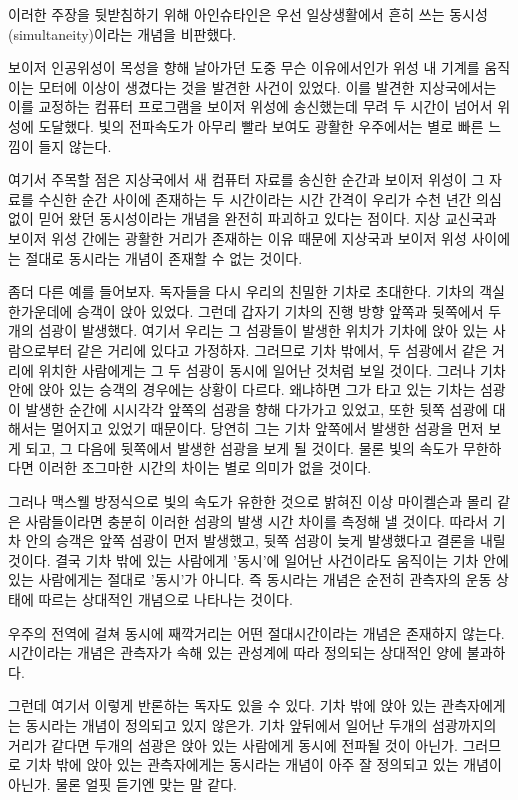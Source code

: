 이러한 주장을 뒷받침하기 위해 아인슈타인은 우선 일상생활에서 흔히 쓰는
동시성(simultaneity)이라는 개념을 비판했다.

보이저 인공위성이 목성을 향해 날아가던 도중 무슨 이유에서인가 위성 내 기계를 움직이는
모터에 이상이 생겼다는 것을 발견한 사건이 있었다. 이를 발견한 지상국에서는 이를 교정하는
컴퓨터 프로그램을 보이저 위성에 송신했는데 무려 두 시간이 넘어서 위성에 도달했다. 빛의
전파속도가 아무리 빨라 보여도 광활한 우주에서는 별로 빠른 느낌이 들지 않는다.

여기서 주목할 점은 지상국에서 새 컴퓨터 자료를 송신한 순간과 보이저 위성이 그 자료를
수신한 순간 사이에 존재하는 두 시간이라는 시간 간격이 우리가 수천 년간 의심없이 믿어 왔던
동시성이라는 개념을 완전히 파괴하고 있다는 점이다. 지상 교신국과 보이저 위성 간에는 광활한
거리가 존재하는 이유 때문에 지상국과 보이저 위성 사이에는 절대로 동시라는 개념이 존재할 수
없는 것이다.

좀더 다른 예를 들어보자. 독자들을 다시 우리의 친밀한 기차로 초대한다. 기차의 객실
한가운데에 승객이 앉아 있었다. 그런데 갑자기 기차의 진행 방향 앞쪽과 뒷쪽에서 두 개의
섬광이 발생했다. 여기서 우리는 그 섬광들이 발생한 위치가 기차에 앉아 있는 사람으로부터
같은 거리에 있다고 가정하자. 그러므로 기차 밖에서, 두 섬광에서 같은 거리에 위치한
사람에게는 그 두 섬광이 동시에 일어난 것처럼 보일 것이다. 그러나 기차 안에 앉아 있는
승객의 경우에는 상황이
다르다. 왜냐하면 그가 타고 있는 기차는 섬광이 발생한 순간에 시시각각 앞쪽의 섬광을 향해
다가가고 있었고, 또한 뒷쪽 섬광에 대해서는 멀어지고 있었기 때문이다. 당연히 그는 기차
앞쪽에서 발생한 섬광을 먼저 보게 되고, 그 다음에 뒷쪽에서 발생한 섬광을 보게 될 것이다.
물론 빛의 속도가 무한하다면 이러한 조그마한 시간의 차이는 별로 의미가 없을 것이다.

그러나 맥스웰 방정식으로 빛의 속도가 유한한 것으로 밝혀진 이상 마이켈슨과 몰리 같은
사람들이라면 충분히 이러한 섬광의 발생 시간 차이를 측정해 낼 것이다. 따라서 기차 안의
승객은 앞쪽 섬광이 먼저 발생했고, 뒷쪽 섬광이 늦게 발생했다고 결론을 내릴 것이다. 결국
기차 밖에 있는 사람에게 '동시'에 일어난 사건이라도 움직이는 기차 안에 있는 사람에게는
절대로 '동시'가 아니다. 즉 동시라는 개념은 순전히 관측자의 운동 상태에 따르는 상대적인
개념으로 나타나는 것이다.

\beginbf
  우주의 전역에 걸쳐 동시에 째깍거리는 어떤 절대시간이라는 개념은 존재하지 않는다.
시간이라는 개념은 관측자가 속해 있는 관성계에 따라 정의되는 상대적인 양에 불과하다.
\endbf

그런데 여기서 이렇게 반론하는 독자도 있을 수 있다. 기차 밖에 앉아 있는 관측자에게는
동시라는 개념이 정의되고 있지 않은가. 기차 앞뒤에서 일어난 두개의 섬광까지의 거리가 같다면
두개의 섬광은 앉아 있는 사람에게 동시에 전파될 것이 아닌가. 그러므로 기차 밖에 앉아 있는
관측자에게는 동시라는 개념이 아주 잘 정의되고 있는 개념이 아닌가. 물론 얼핏 듣기엔 맞는
말 같다.

